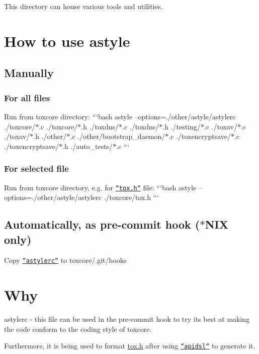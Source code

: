 This directory can house various tools and utilities.

\section*{How to use astyle}

\subsection*{Manually}

\subsubsection*{For all files}

Run from {\ttfamily toxcore} directory\+: ```bash astyle --options=./other/astyle/astylerc ./toxcore/$\ast$.c ./toxcore/$\ast$.h ./toxdns/$\ast$.c ./toxdns/$\ast$.h ./testing/$\ast$.c ./toxav/$\ast$.c ./toxav/$\ast$.h ./other/$\ast$.c ./other/bootstrap\+\_\+daemon/$\ast$.c ./toxencryptsave/$\ast$.c ./toxencryptsave/$\ast$.h ./auto\+\_\+tests/$\ast$.c ```

\subsubsection*{For selected file}

Run from {\ttfamily toxcore} directory, e.\+g. for \href{/toxcore/tox.h}{\tt ``tox.h``} file\+: ```bash astyle --options=./other/astyle/astylerc ./toxcore/tox.h ```

\subsection*{Automatically, as pre-\/commit hook ($\ast$\+N\+I\+X only)}

Copy \href{/other/astyle/astylerc}{\tt ``astylerc``} to {\ttfamily toxcore/.git/hooks}

\section*{Why}

{\ttfamily astylerc} -\/ this file can be used in the pre-\/commit hook to try its best at making the code conform to the coding style of toxcore.

Furthermore, it is being used to format {\ttfamily \hyperlink{tox_8h_source}{tox.\+h}} after using \href{/other/apidsl}{\tt ``apidsl``} to generate it. 